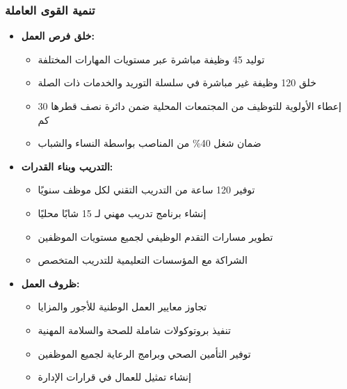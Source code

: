 \subsubsection{تنمية القوى العاملة}
\begin{itemize}
    \item \textbf{خلق فرص العمل:}
    \begin{itemize}
        \item توليد 45 وظيفة مباشرة عبر مستويات المهارات المختلفة
        \item خلق 120 وظيفة غير مباشرة في سلسلة التوريد والخدمات ذات الصلة
        \item إعطاء الأولوية للتوظيف من المجتمعات المحلية ضمن دائرة نصف قطرها 30 كم
        \item ضمان شغل 40\% من المناصب بواسطة النساء والشباب
    \end{itemize}
    
    \item \textbf{التدريب وبناء القدرات:}
    \begin{itemize}
        \item توفير 120 ساعة من التدريب التقني لكل موظف سنويًا
        \item إنشاء برنامج تدريب مهني لـ 15 شابًا محليًا
        \item تطوير مسارات التقدم الوظيفي لجميع مستويات الموظفين
        \item الشراكة مع المؤسسات التعليمية للتدريب المتخصص
    \end{itemize}
    
    \item \textbf{ظروف العمل:}
    \begin{itemize}
        \item تجاوز معايير العمل الوطنية للأجور والمزايا
        \item تنفيذ بروتوكولات شاملة للصحة والسلامة المهنية
        \item توفير التأمين الصحي وبرامج الرعاية لجميع الموظفين
        \item إنشاء تمثيل للعمال في قرارات الإدارة
    \end{itemize}
\end{itemize}

